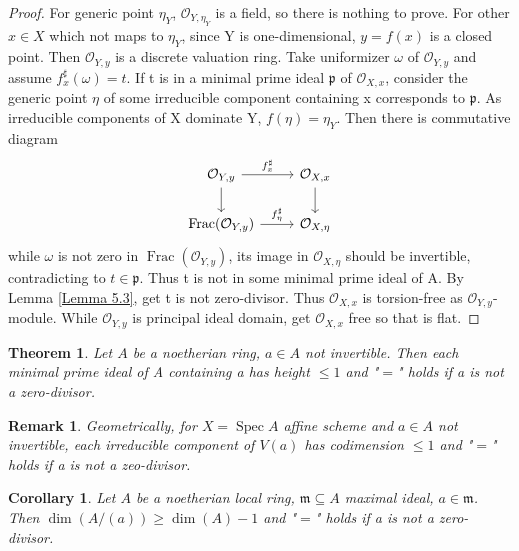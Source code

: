 \documentclass{ctexart}
\newtheorem{remark}{Remark}[section]
\newtheorem{theorem}{Theorem}[section]
\newtheorem{corollary}{Corollary}[section]
\newcommand{\spec}{\operatorname{Spec}}
\newcommand{\fraction}{\operatorname{Frac}}
\begin{document}
\begin{proof}
    For generic point $\eta_{Y}$, $\mathcal{O}_{Y, \eta_{Y}}$ is a field, so there is nothing to prove.
    For other $x\in X$ which not maps to $\eta_{Y}$, since Y is one-dimensional, $y = f(x)$ is a closed point.
    Then $\mathcal{O}_{Y, y}$ is a discrete valuation ring.
    Take uniformizer $\omega$ of $\mathcal{O}_{Y, y}$ and assume $f_{x}^{\sharp}(\omega) = t$.
    If t is in a minimal prime ideal $\mathfrak{p}$ of $\mathcal{O}_{X, x}$, 
    consider the generic point $\eta$ of some irreducible component containing x corresponds to $\mathfrak{p}$.
    As irreducible components of X dominate Y, $f(\eta) = \eta_{Y}$.
    Then there is commutative diagram
    \begin{equation*}
        \begin{tikzcd}
            \mathcal{O}_{Y, y} \arrow[r, "f_{x}^{\sharp}"] \arrow[d] &
            \mathcal{O}_{X, x} \arrow[d] \\
            \fraction(\mathcal{O}_{Y, y}) \arrow[r, "f_{\eta}^{\sharp}"] &
            \mathcal{O}_{X, \eta}
        \end{tikzcd}
    \end{equation*}
    while $\omega$ is not zero in $\fraction(\mathcal{O}_{Y, y})$, its image in $\mathcal{O}_{X, \eta}$ should be invertible, contradicting to $t\in \mathfrak{p}$.
    Thus t is not in some minimal prime ideal of A.
    By Lemma \ref{Lemma 5.3}, get t is not zero-divisor.
    Thus $\mathcal{O}_{X, x}$ is torsion-free as $\mathcal{O}_{Y, y}$-module.
    While $\mathcal{O}_{Y, y}$ is principal ideal domain, get $\mathcal{O}_{X, x}$ free so that is flat.
\end{proof}
\begin{theorem}
    Let $A$ be a noetherian ring, $a\in A$ not invertible.
    Then each minimal prime ideal of A containing a has height $\le 1$ and "$=$" holds if a is not a zero-divisor.
    \label{Theorem 5.7}
\end{theorem}
\begin{remark}
    Geometrically, for $X = \spec A$ affine scheme and $a\in A$ not invertible, each irreducible component of $V(a)$ has codimension $\le 1$ and "$=$" holds if a is not a zeo-divisor.
\end{remark}
\begin{corollary}
    Let $A$ be a noetherian local ring, $\mathfrak{m} \subseteq A$ maximal ideal, $a\in \mathfrak{m}$.
    Then $\dim(A/(a)) \ge \dim(A) - 1$ and "$=$" holds if a is not a zero-divisor.
    \label{Corollary 5.4}
\end{corollary}
\end{document}
